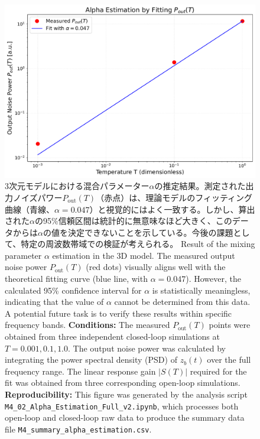 \documentclass[a4paper,11pt,ja=standard,lualatex]{bxjsarticle}
\begin{document}
\begin{figure}[htbp]
    \centering
    \includegraphics[width=0.8\linewidth]{M4_Fig3_Alpha_Estimation_Fit_EN.pdf}
    \caption{3次元モデルにおける混合パラメーター$\alpha$の推定結果。測定された出力ノイズパワー$P_{\mathrm{out}}(T)$（赤点）は、理論モデルのフィッティング曲線（青線、$\alpha=0.047$）と視覚的にはよく一致する。しかし、算出された$\alpha$の95\%信頼区間は統計的に無意味なほど大きく、このデータからは$\alpha$の値を決定できないことを示している。今後の課題として、特定の周波数帯域での検証が考えられる。
    \newline\newline
    Result of the mixing parameter $\alpha$ estimation in the 3D model. The measured output noise power $P_{\mathrm{out}}(T)$ (red dots) visually aligns well with the theoretical fitting curve (blue line, with $\alpha=0.047$). However, the calculated 95\% confidence interval for $\alpha$ is statistically meaningless, indicating that the value of $\alpha$ cannot be determined from this data. A potential future task is to verify these results within specific frequency bands.
    \newline\newline
    \textbf{Conditions:} The measured $P_{\mathrm{out}}(T)$ points were obtained from three independent closed-loop simulations at $T=0.001, 0.1, 1.0$. The output noise power was calculated by integrating the power spectral density (PSD) of $z_b(t)$ over the full frequency range. The linear response gain $|S(T)|$ required for the fit was obtained from three corresponding open-loop simulations.
    \textbf{Reproducibility:} This figure was generated by the analysis script \texttt{M4\_02\_Alpha\_Estimation\_Full\_v2.ipynb}, which processes both open-loop and closed-loop raw data to produce the summary data file \texttt{M4\_summary\_alpha\_estimation.csv}.}
    \label{fig:alpha_estimation_fit}
\end{figure}
\end{document}
